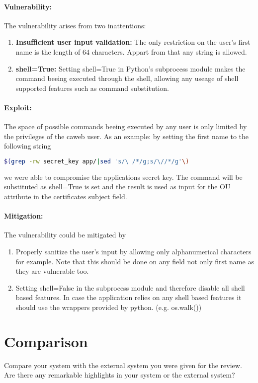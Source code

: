 \documentclass[english]{article}
\begin{document}
 \paragraph{Vulnerability:}
 The vulnerability arises from two inattentions:
\begin{enumerate}
\item \textbf{Insufficient user input validation:} The only restriction on the user's first name is the length of 64 characters. Appart from that any string is allowed.
\item \textbf{shell=True:} Setting shell=True in Python's subprocess module makes the command beeing executed through the shell, allowing any useage of shell supported features such as command substitution. 
\end{enumerate}

\paragraph{Exploit:}
The space of possible commands beeing executed by any user is only limited by the privileges of the caweb user. As an example: by setting the first name to the following string 
\begin{lstlisting}[language=bash]
$(grep -rw secret_key app/|sed 's/\ /*/g;s/\//*/g'\)
\end{lstlisting}
we were able to compromise the applications secret key. The command will be substituted as shell=True is set and the result is used as input for the OU attribute in the certificates subject field.

\paragraph{Mitigation:} The vulnerability could be mitigated by
\begin{enumerate}
\item Properly sanitize the user's input by allowing only alphanumerical characters for example. Note that this should be done on any field not only first name as they are vulnerable too. 
\item Setting shell=False in the subprocess module and therefore disable all shell based features. In case the application relies on any shell based features it should use the wrappers provided by python. (e.g. os.walk())
\end{enumerate}



\section{Comparison}

Compare your system with the external system you were given for the review. Are there any remarkable highlights in your system or the external system?
\end{document}

